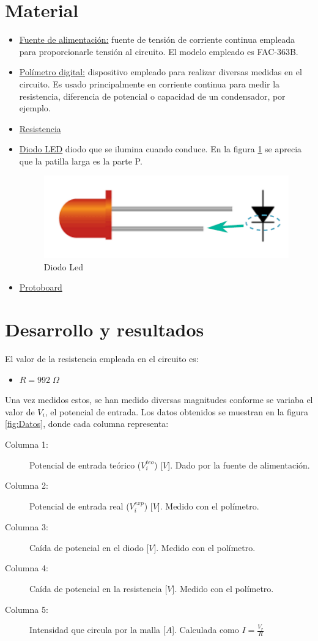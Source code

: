 \section{Material}
\begin{itemize}
    \item \underline{Fuente de alimentación:} fuente de tensión de corriente continua empleada para proporcionarle tensión al circuito. El modelo empleado es FAC-363B.
    \item \underline{Polímetro digital:} dispositivo empleado para realizar diversas medidas en el circuito. Es usado principalmente en corriente continua para medir la resistencia, diferencia de potencial o capacidad de un condensador, por ejemplo.
    \item \underline{Resistencia}
    \item \underline{Diodo LED} diodo que se ilumina cuando conduce. En la figura \ref{fig:LED} se aprecia que la patilla larga es la parte P.
    \begin{figure}[H]
        \centering
        \includegraphics[height=1.5 cm]{Imágenes 04/LED.png}
        \caption{Diodo Led}
        \label{fig:LED}
    \end{figure}
    \item \underline{Protoboard}
\end{itemize}


\section{Desarrollo y resultados}
El valor de la resistencia empleada en el circuito es:
\begin{itemize}
    \item $R = 992\;\Omega$
\end{itemize}
Una vez medidos estos, se han medido diversas magnitudes conforme se variaba el valor de $V_i$, el potencial de entrada. Los datos obtenidos se muestran en la figura \ref{fig:Datos}, donde cada columna representa:
\begin{description}
    \item [Columna 1:] Potencial de entrada teórico ($V_i^{teo}$) [$V$]. Dado por la fuente de alimentación.
    \item [Columna 2:] Potencial de entrada real ($V_i^{exp}$) [$V$]. Medido con el polímetro.
    \item [Columna 3:] Caída de potencial en el diodo [$V$]. Medido con el polímetro.
    \item [Columna 4:] Caída de potencial en la resistencia [$V$]. Medido con el polímetro.
    \item [Columna 5:] Intensidad que circula por la malla [$A$]. Calculada como $I = \frac{V_r}{R}$
\end{description}
\newpage

